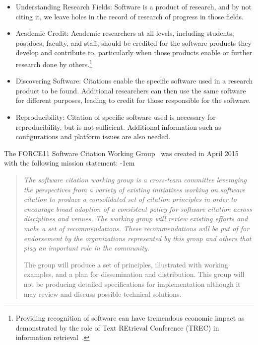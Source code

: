 \documentclass[11pt, oneside]{amsart}
\newenvironment{italicquotes}
{\begin{quote}\itshape}
{\end{quote}}
\begin{document}
\begin{itemize}
\item Understanding Research Fields: Software is a product of research, and by not
citing it, we leave holes in the record of research of progress in those fields.

\item Academic Credit: Academic researchers at all levels, including students,
postdocs, faculty, and staff, should be credited for the software products they
develop and contribute to, particularly when those products enable or further
research done by others.\footnote{Providing recognition of software can have tremendous economic impact as demonstrated by the role of Text REtrieval Conference (TREC) in information retrieval~\cite{trec-economic-impact}.}

\item Discovering Software: Citations enable the specific software used in a
research product to be found. Additional researchers can then use the same
software for different purposes, leading to credit for those responsible for the
software.

\item Reproducibility: Citation of specific software used is necessary for
reproducibility, but is not sufficient. Additional information such as
configurations and platform issues are also needed.

\end{itemize}


The FORCE11 Software Citation Working Group~\cite{f11scwg} was created in April
2015 with the following mission statement:
\advance\leftmargini -1em
\begin{italicquotes}
The software citation working group is a cross-team committee leveraging the
perspectives from a variety of existing initiatives working on software citation
to produce a consolidated set of citation principles in order to encourage broad
adoption of a consistent policy for software citation across disciplines and
venues. The working group will review existing efforts and make a set of
recommendations. These recommendations will be put of for endorsement by the
organizations represented by this group and others that play an important role
in the community.

The group will produce a set of principles, illustrated with working examples,
and a plan for dissemination and distribution. This group will not be producing
detailed specifications for implementation although it may review and discuss
possible technical solutions.
\end{italicquotes}
\end{document}
